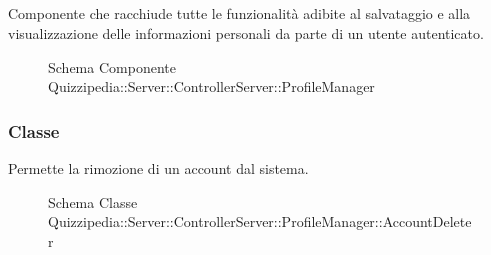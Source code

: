 \subsection{}
Componente che racchiude tutte le funzionalità adibite al salvataggio e alla visualizzazione delle informazioni personali da parte di un utente autenticato.
\begin{figure}[H]
\centering
\noindent{}
\caption[Schema Componente Quizzipedia::Server::ControllerServer::ProfileManager]{Schema Componente Quizzipedia::Server::ControllerServer::ProfileManager}
\end{figure}
\subsubsection{Classe }
Permette la rimozione di un account dal sistema.
\begin{figure}[H]
\centering
\noindent{}
\caption[Schema Classe AccountDeleter]{Schema Classe Quizzipedia::Server::ControllerServer::ProfileManager::AccountDeleter}
\end{figure}
